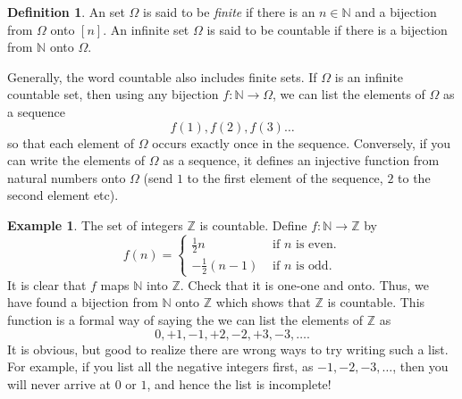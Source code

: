 \documentclass[preprint,  11pt]{amsart}
\theoremstyle{plain} %
\theoremstyle{definition} %
\newtheorem{definition}[theorem]{Definition}
\newtheorem{example}[theorem]{Example}
\begin{document}
{%


\begin{definition} An set $\Omega$ is said to be {\em finite} if there is an $n\in \mathbb{N}$ and a bijection from $\Omega$ onto $[n]$. An infinite set $\Omega$ is said to be countable if there is a bijection from $\mathbb{N}$ onto $\Omega$.
\end{definition}
Generally, the word countable also includes finite sets. If $\Omega$ is an infinite countable set, then using any bijection $f:\mathbb{N}\rightarrow \Omega$, we can list the elements of $\Omega$ as a sequence $$f(1),f(2),f(3)\ldots$$ so that each element of $\Omega$ occurs exactly once in the sequence. Conversely, if you can write the elements of $\Omega$ as a sequence, it defines an injective function from natural numbers onto $\Omega$ (send $1$ to the first element of the sequence, $2$ to the second element etc).

\begin{example} The set of integers $\mathbb{Z}$ is countable. Define $f:\mathbb{N}\rightarrow \mathbb{Z}$ by
$$
f(n)=\begin{cases}\frac{1}{2} n & \mbox{ if }n\mbox{ is even}. \\
-\frac{1}{2} (n-1) & \mbox{ if }n\mbox{ is odd}.
\end{cases}
$$
It is clear that $f$ maps $\mathbb{N}$ into $\mathbb{Z}$. Check that it is one-one and onto. Thus, we have found a bijection from $\mathbb{N}$ onto $\mathbb{Z}$ which shows that $\mathbb{Z}$ is countable. This function is a formal way of saying the we can list the elements of $\mathbb{Z}$ as
$$
0, +1, -1,+2,-2,+3,-3,\ldots.
$$
It is obvious, but good to realize there are wrong ways to try writing such a list. For example, if you list all the negative integers first, as $-1,-2,-3,\ldots$, then you will never arrive at $0$ or $1$, and hence the list is incomplete!
\end{example}

}
\end{document}
